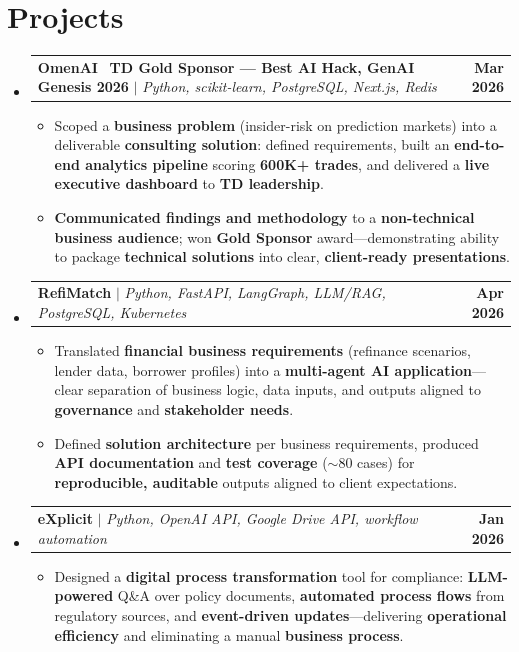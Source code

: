 \documentclass[letterpaper,10pt]{article}
\makeatletter
\newcommand{\resumeItem}[1]{
  \item\small{
    {#1 \vspace{-1pt}}
  }
}
\newcommand{\resumeProjectHeading}[2]{
    \item
    \begin{tabular*}{1.001\textwidth}{l@{\extracolsep{\fill}}r}
      \small#1 & \textbf{\small #2}\\
    \end{tabular*}\vspace{-9pt}
}
\newcommand{\resumeSubHeadingListStart}{\begin{itemize}[leftmargin=0.0in, label={}]}
\newcommand{\resumeSubHeadingListEnd}{\end{itemize}}
\newcommand{\resumeItemListStart}{\begin{itemize}[leftmargin=0.15in, topsep=0pt, itemsep=0pt, parsep=0pt, partopsep=0pt]}
\newcommand{\resumeItemListEnd}{\end{itemize}\vspace{-3pt}}
\makeatother
\begin{document}
\section{Projects}
  \resumeSubHeadingListStart
    \resumeProjectHeading
      {\textbf{OmenAI} \textbar\ \textbf{TD Gold Sponsor --- Best AI Hack, GenAI Genesis 2026} $|$ \emph{Python, scikit-learn, PostgreSQL, Next.js, Redis}}{Mar 2026}
    \resumeItemListStart
      \resumeItem{Scoped a \textbf{business problem} (insider-risk on prediction markets) into a deliverable \textbf{consulting solution}: defined requirements, built an \textbf{end-to-end analytics pipeline} scoring \textbf{600K+ trades}, and delivered a \textbf{live executive dashboard} to \textbf{TD leadership}.}
      \resumeItem{\textbf{Communicated findings and methodology} to a \textbf{non-technical business audience}; won \textbf{Gold Sponsor} award---demonstrating ability to package \textbf{technical solutions} into clear, \textbf{client-ready presentations}.}
    \resumeItemListEnd
    \vspace{-5pt}
    \resumeProjectHeading
      {\textbf{RefiMatch} $|$ \emph{Python, FastAPI, LangGraph, LLM/RAG, PostgreSQL, Kubernetes}}{Apr 2026}
    \resumeItemListStart
      \resumeItem{Translated \textbf{financial business requirements} (refinance scenarios, lender data, borrower profiles) into a \textbf{multi-agent AI application}---clear separation of business logic, data inputs, and outputs aligned to \textbf{governance} and \textbf{stakeholder needs}.}
      \resumeItem{Defined \textbf{solution architecture} per business requirements, produced \textbf{API documentation} and \textbf{test coverage} ($\sim$80 cases) for \textbf{reproducible, auditable} outputs aligned to client expectations.}
    \resumeItemListEnd
    \vspace{-5pt}
    \resumeProjectHeading
      {\textbf{eXplicit} $|$ \emph{Python, OpenAI API, Google Drive API, workflow automation}}{Jan 2026}
    \resumeItemListStart
      \resumeItem{Designed a \textbf{digital process transformation} tool for compliance: \textbf{LLM-powered} Q\&A over policy documents, \textbf{automated process flows} from regulatory sources, and \textbf{event-driven updates}---delivering \textbf{operational efficiency} and eliminating a manual \textbf{business process}.}
    \resumeItemListEnd
  \resumeSubHeadingListEnd
\vspace{-6pt}
\end{document}
